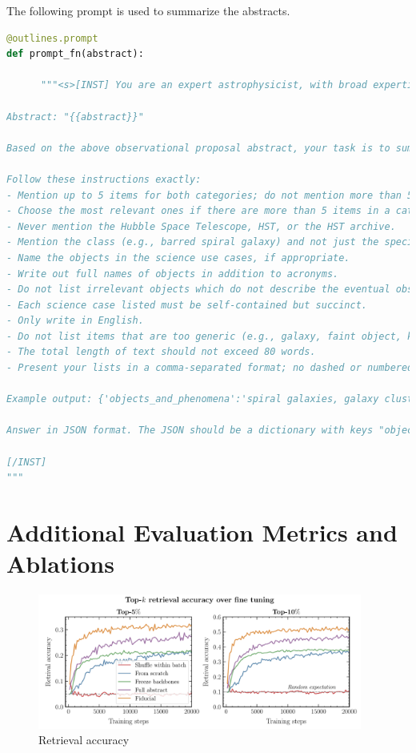 \documentclass[10pt]{article} %
\begin{document}
The following prompt is used to summarize the abstracts.

\begin{lstlisting}[language=Python]
@outlines.prompt
def prompt_fn(abstract):
            
      """<s>[INST] You are an expert astrophysicist, with broad expertise across observational and theoretical astrophysics. You are able to extract core information from astrophysical texts.

Abstract: "{{abstract}}"

Based on the above observational proposal abstract, your task is to summarize the nature of the eventual observations. You will identify the astrophysical objects and phenomena, as well as the potential science use cases described in the abstract.

Follow these instructions exactly:
- Mention up to 5 items for both categories; do not mention more than 5 items in either category. 
- Choose the most relevant ones if there are more than 5 items in a category.
- Never mention the Hubble Space Telescope, HST, or the HST archive.
- Mention the class (e.g., barred spiral galaxy) and not just the specific instance (e.g., Andromeda).
- Name the objects in the science use cases, if appropriate.
- Write out full names of objects in addition to acronyms.
- Do not list irrelevant objects which do not describe the eventual observation, such as units or proposal Cycle numbers. List fewer but more relevant objects, if in doubt.
- Each science case listed must be self-contained but succinct.
- Only write in English.
- Do not list items that are too generic (e.g., galaxy, faint object, kinematics)
- The total length of text should not exceed 80 words.
- Present your lists in a comma-separated format; no dashed or numbered lists.

Example output: {'objects_and_phenomena':'spiral galaxies, galaxy clusters, supernova remnants', 'science_use_cases':'model galactic structure and evolution, characterize dark matter distribution in clusters, analyze expansion rates of supernova remnants'}

Answer in JSON format. The JSON should be a dictionary with keys "objects_and_phenomena" and "science_use_cases".

[/INST]
"""
\end{lstlisting}

\section{Additional Evaluation Metrics and Ablations}
\label{app:ablations}

\begin{figure}[!h]
\includegraphics[width=0.95\textwidth]{plots/retrieval_acc.pdf}
\caption{Retrieval accuracy}
\label{fig:retrieval_acc}
\end{figure}
  
\end{document}
